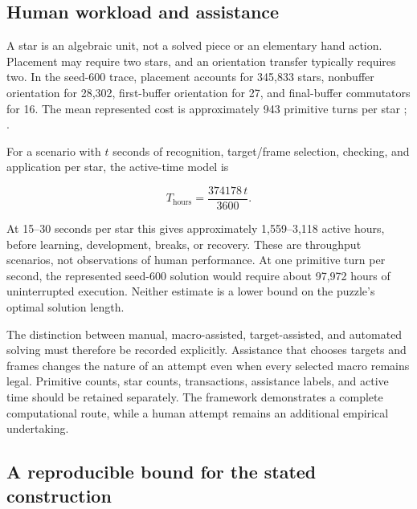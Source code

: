 \documentclass[a4paper,11pt]{article}
\begin{document}
\subsection{Human workload and assistance}

A star is an algebraic unit, not a solved piece or an elementary hand action. Placement may require two stars, and an orientation transfer typically requires two. In the seed-600 trace, placement accounts for 345,833 stars, nonbuffer orientation for 28,302, first-buffer orientation for 27, and final-buffer commutators for 16. The mean represented cost is approximately 943 primitive turns per star \cite[pp.~27--31]{transcript}; \cite{algorithms}.

For a scenario with \(t\) seconds of recognition, target/frame selection, checking, and application per star, the active-time model is

\begin{equation}
T_{\mathrm{hours}}=\frac{374178\,t}{3600}.
\label{eq:human-time}
\end{equation}

At 15--30 seconds per star this gives approximately 1,559--3,118 active hours, before learning, development, breaks, or recovery. These are throughput scenarios, not observations of human performance. At one primitive turn per second, the represented seed-600 solution would require about 97,972 hours of uninterrupted execution. Neither estimate is a lower bound on the puzzle's optimal solution length.

The distinction between manual, macro-assisted, target-assisted, and automated solving must therefore be recorded explicitly. Assistance that chooses targets and frames changes the nature of an attempt even when every selected macro remains legal. Primitive counts, star counts, transactions, assistance labels, and active time should be retained separately. The framework demonstrates a complete computational route, while a human attempt remains an additional empirical undertaking.

\subsection{A reproducible bound for the stated construction}
\end{document}
